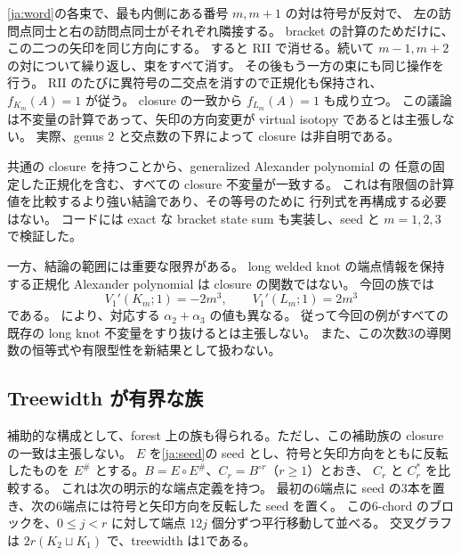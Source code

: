 \documentclass[12pt]{amsart}
\theoremstyle{definition}
\theoremstyle{remark}
\numberwithin{equation}{section}
\begin{document}
\eqref{ja:word}の各束で、最も内側にある番号 $m,m+1$ の対は符号が反対で、
左の訪問点同士と右の訪問点同士がそれぞれ隣接する。
bracket の計算のためだけに、この二つの矢印を同じ方向にする。
すると RII で消せる。続いて $m-1,m+2$ の対について繰り返し、束をすべて消す。
その後もう一方の束にも同じ操作を行う。
RII のたびに異符号の二交点を消すので正規化も保持され、$f_{K_m}(A)=1$ が従う。
closure の一致から $f_{L_m}(A)=1$ も成り立つ。
この議論は不変量の計算であって、矢印の方向変更が virtual isotopy であるとは主張しない。
実際、genus 2 と交点数の下界によって closure は非自明である。

共通の closure を持つことから、generalized Alexander polynomial の
任意の固定した正規化を含む、すべての closure 不変量が一致する。
これは有限個の計算値を比較するより強い結論であり、その等号のために
行列式を再構成する必要はない。
コードには exact な bracket state sum も実装し、seed と $m=1,2,3$ で検証した。

一方、結論の範囲には重要な限界がある。
long welded knot の端点情報を保持する正規化 Alexander polynomial は closure の関数ではない。
今回の族では
\[
V_1'(K_m;1)=-2m^3,\qquad V_1'(L_m;1)=2m^3
\]
である。\cite[Theorem 7.4]{SW} により、対応する $\alpha_2+\alpha_3$ の値も異なる。
従って今回の例がすべての既存の long knot 不変量をすり抜けるとは主張しない。
また、この次数3の導関数の恒等式や有限型性を新結果として扱わない。

\subsection{Treewidth が有界な族}\label{ja:forest}
補助的な構成として、forest 上の族も得られる。ただし、この補助族の
closure の一致は主張しない。
$E$ を\eqref{ja:seed}の seed とし、符号と矢印方向をともに反転したものを
$E^\#$ とする。$B=E\circ E^\#$、$C_r=B^{\circ r}$（$r\ge1$）とおき、
$C_r$ と $C_r^*$ を比較する。
これは次の明示的な端点定義を持つ。
最初の6端点に seed の3本を置き、次の6端点には符号と矢印方向を反転した seed を置く。
この6-chord のブロックを、$0\le j<r$ に対して端点 $12j$ 個分ずつ平行移動して並べる。
交叉グラフは $2r(K_2\sqcup K_1)$ で、treewidth は1である。
\end{document}
